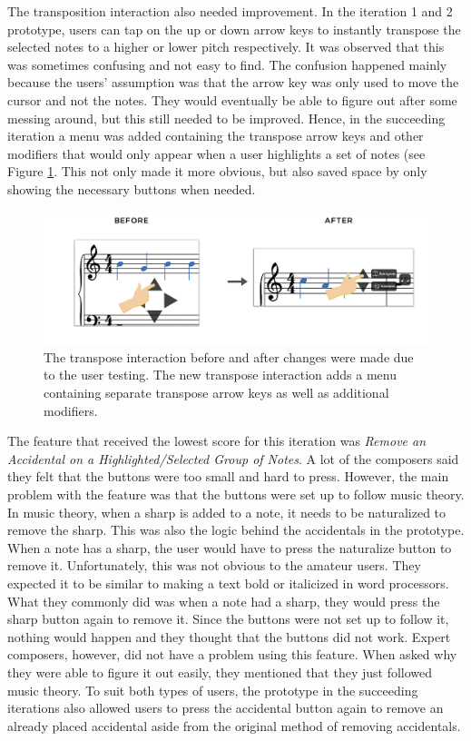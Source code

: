 			The transposition interaction also needed improvement. In the iteration 1 and 2 prototype, users can tap on the up or down arrow keys to instantly transpose the selected notes to a higher or lower pitch respectively. It was observed that this was sometimes confusing and not easy to find. The confusion happened mainly because the users' assumption was that the arrow key was only used to move the cursor and not the notes. They would eventually be able to figure out after some messing around, but this still needed to be improved. Hence, in the succeeding iteration a menu was added containing the transpose arrow keys and other modifiers that would only appear when a user highlights a set of notes (see Figure \ref{fig:transpose}. This not only made it more obvious, but also saved space by only showing the necessary buttons when needed.

			\begin{figure}[h]
				\centering
				\includegraphics[scale=0.25]{figures/before-after-transpose}
			    \caption{The transpose interaction before and after changes were made due to the user testing. The new transpose interaction adds a menu containing separate transpose arrow keys as well as additional modifiers.}
			    \label{fig:transpose}
			\end{figure}

			The feature that received the lowest score for this iteration was \textit{Remove an Accidental on a Highlighted/Selected Group of Notes}. A lot of the composers said they felt that the buttons were too small and hard to press. However, the main problem with the feature was that the buttons were set up to follow music theory. In music theory, when a sharp is added to a note, it needs to be naturalized to remove the sharp. This was also the logic behind the accidentals in the prototype. When a note has a sharp, the user would have to press the naturalize button to remove it. Unfortunately, this was not obvious to the amateur users. They expected it to be similar to making a text bold or italicized in word processors. What they commonly did was when a note had a sharp, they would press the sharp button again to remove it. Since the buttons were not set up to follow it, nothing would happen and they thought that the buttons did not work. Expert composers, however, did not have a problem using this feature. When asked why they were able to figure it out easily, they mentioned that they just followed music theory. To suit both types of users, the prototype in the succeeding iterations also allowed users to press the accidental button again to remove an already placed accidental aside from the original method of removing accidentals.

